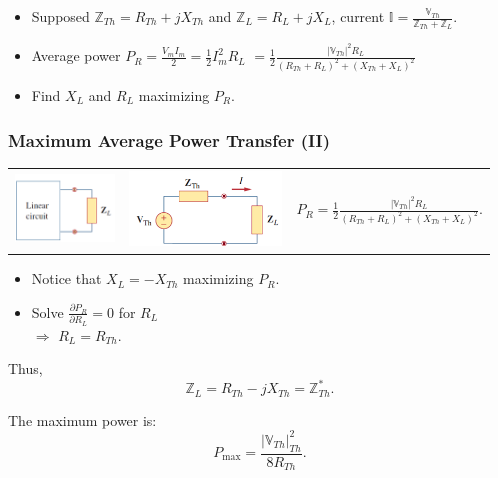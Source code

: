 \documentclass{beamer}
\begin{document}
\begin{frame}[fragile]
\begin{columns}[c]
\end{columns}

\begin{itemize}
\item Supposed $\mathbb{Z}_{Th} = R_{Th} + jX_{Th}$
and $\mathbb{Z}_L = R_L + jX_L$,
current $\mathbb{I} = \frac{\mathbb{V}_{Th}}{\mathbb{Z}_{Th} + \mathbb{Z}_L}$.
\item Average power $P_R = \frac{V_m I_m}{2} = \frac{1}{2} I_m^2 R_L$
$=\frac{1}{2} \frac{ |\mathbb{V}_{Th}|^2 R_L}{(R_{Th} + R_L)^2 + (X_{Th} + X_L)^2}$
\item Find $X_L$ and $R_L$ maximizing $P_R$.
\end{itemize}

\end{frame}

\begin{frame}[fragile]
\frametitle{Maximum Average Power Transfer (II)}

\begin{tabular}{ccl}
\includegraphics[height=1.8cm]{src/Max1.png}
&
\includegraphics[height=2cm]{src/Max2.png}
&
$P_R = \frac{1}{2} \frac{ |\mathbb{V}_{Th}|^2 R_L}{(R_{Th} + R_L)^2 + (X_{Th} + X_L)^2}$.
\end{tabular}

\begin{itemize}
\item Notice that $X_L = - X_{Th}$ maximizing $P_R$.
\item Solve $\frac{\partial P_R}{\partial R_L} = 0$ for $R_L$
\\
$\Rightarrow$ $R_L = R_{Th}$.
\end{itemize}

Thus,
\begin{equation}
\mathbb{Z}_L = R_{Th} - jX_{Th} = \mathbb{Z}^\ast_{Th}
\label{eq: Z max power transfer}.
\end{equation}

The maximum power is:
\begin{equation}
P_{\max} = \frac{|\mathbb{V}_{Th}|_{Th}^2}{8 R_{Th}}
\label{eq: max power transfer}.
\end{equation}

\end{frame}
\end{document}
